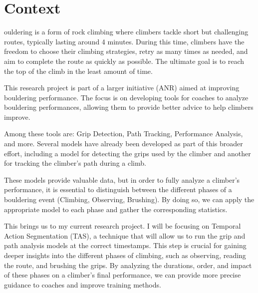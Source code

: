 \section{Context}

ouldering is a form of rock climbing where climbers tackle short but challenging routes, typically lasting around 4 minutes. During this time, climbers have the freedom to choose their climbing strategies, retry as many times as needed, and aim to complete the route as quickly as possible. The ultimate goal is to reach the top of the climb in the least amount of time.

This research project is part of a larger initiative (ANR) aimed at improving bouldering performance. The focus is on developing tools for coaches to analyze bouldering performances, allowing them to provide better advice to help climbers improve.

Among these tools are: Grip Detection, Path Tracking, Performance Analysis, and more. Several models have already been developed as part of this broader effort, including a model for detecting the grips used by the climber and another for tracking the climber's path during a climb.

These models provide valuable data, but in order to fully analyze a climber's performance, it is essential to distinguish between the different phases of a bouldering event (Climbing, Observing, Brushing). By doing so, we can apply the appropriate model to each phase and gather the corresponding statistics.

This brings us to my current research project. I will be focusing on Temporal Action Segmentation (TAS), a technique that will allow us to run the grip and path analysis models at the correct timestamps. This step is crucial for gaining deeper insights into the different phases of climbing, such as observing, reading the route, and brushing the grips. By analyzing the durations, order, and impact of these phases on a climber's final performance, we can provide more precise guidance to coaches and improve training methods.

